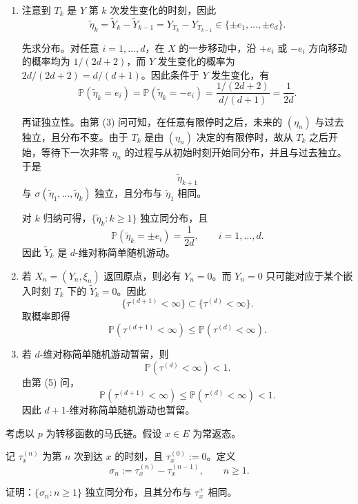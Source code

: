 \documentclass{ctexart}
\begin{document}
\begin{solution}
\begin{enumerate}
    \item
      注意到 \(T_k\) 是 \(Y\) 第 \(k\) 次发生变化的时刻，因此
      \[
        \widetilde\eta_k=\widetilde Y_k-\widetilde Y_{k-1}
        =
        Y_{T_k}-Y_{T_{k-1}}
        \in\{\pm e_1,\dots,\pm e_d\}.
      \]

      先求分布。对任意 \(i=1,\dots,d\)，在 \(X\) 的一步移动中，沿 \(+e_i\) 或 \(-e_i\) 方向移动的概率均为 \(1/(2d+2)\)，而 \(Y\) 发生变化的概率为 \(2d/(2d+2)=d/(d+1)\)。因此条件于 \(Y\) 发生变化，有
      \[
        \mathbb{P}(\widetilde\eta_k=e_i)
        =
        \mathbb{P}(\widetilde\eta_k=-e_i)
        =
        \frac{1/(2d+2)}{d/(d+1)}
        =
        \frac1{2d}.
      \]

      再证独立性。由第 (3) 问可知，在任意有限停时之后，未来的 \((\eta_n)\) 与过去独立，且分布不变。由于 \(T_k\) 是由 \((\eta_n)\) 决定的有限停时，故从 \(T_k\) 之后开始，等待下一次非零 \(\eta_n\) 的过程与从初始时刻开始同分布，并且与过去独立。于是
      \[
        \widetilde\eta_{k+1}
      \]
      与 \(\sigma(\widetilde\eta_1,\dots,\widetilde\eta_k)\) 独立，且分布与 \(\widetilde\eta_1\) 相同。

      对 \(k\) 归纳可得，\(\{\widetilde\eta_k:k\ge1\}\) 独立同分布，且
      \[
        \mathbb{P}(\widetilde\eta_k=\pm e_i)=\frac1{2d},\qquad i=1,\dots,d.
      \]
      因此 \(\widetilde Y_k\) 是 \(d\)-维对称简单随机游动。

    \item
      若 \(X_n=(Y_n,\xi_n)\) 返回原点，则必有 \(Y_n=0\)。而 \(Y_n=0\) 只可能对应于某个嵌入时刻 \(T_k\) 下的 \(\widetilde Y_k=0\)。因此
      \[
        \{\tau^{(d+1)}<\infty\}\subset\{\tau^{(d)}<\infty\}.
      \]
      取概率即得
      \[
        \mathbb{P}(\tau^{(d+1)}<\infty)\le \mathbb{P}(\tau^{(d)}<\infty).
      \]

    \item
      若 \(d\)-维对称简单随机游动暂留，则
      \[
        \mathbb{P}(\tau^{(d)}<\infty)<1.
      \]
      由第 (5) 问，
      \[
        \mathbb{P}(\tau^{(d+1)}<\infty)\le \mathbb{P}(\tau^{(d)}<\infty)<1.
      \]
      因此 \(d+1\)-维对称简单随机游动也暂留。

  \end{enumerate}
\end{solution}


\begin{problem}\label{pro:1.0.9}
  考虑以 \(p\) 为转移函数的马氏链。假设 \(x\in E\) 为常返态。

  记 \(\tau_x^{(n)}\) 为第 \(n\) 次到达 \(x\) 的时刻，且 \(\tau_x^{(0)}:=0\)。定义
  \[
    \sigma_n:=\tau_x^{(n)}-\tau_x^{(n-1)},\qquad n\ge1.
  \]

  证明：\(\{\sigma_n:n\ge1\}\) 独立同分布，且其分布与 \(\tau_x^+\) 相同。
\end{problem}
\end{document}
